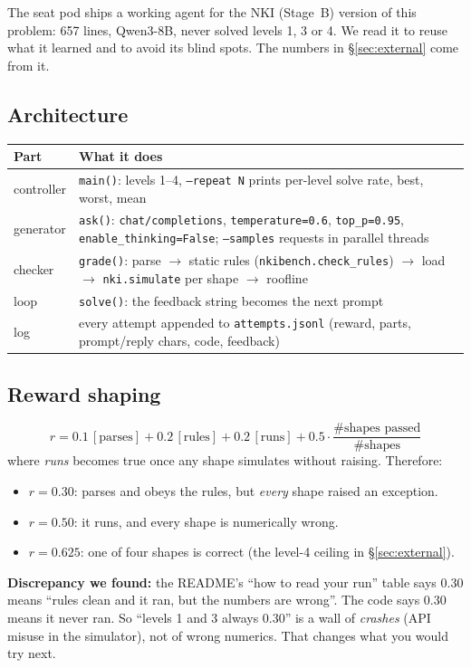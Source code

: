 \documentclass[11pt]{article}
\newcommand{\code}[1]{\texttt{#1}}
\begin{document}
The seat pod ships a working agent for the NKI (Stage~B) version of this problem: 657 lines,
Qwen3-8B, never solved levels 1, 3 or 4. We read it to reuse what it learned and to avoid its
blind spots. The numbers in \S\ref{sec:external} come from it.

\subsection{Architecture}

\begin{tabularx}{\linewidth}{@{}lY@{}}
\toprule
Part & What it does \\
\midrule
controller & \code{main()}: levels 1--4, \code{--repeat N} prints per-level solve rate, best,
  worst, mean \\
generator & \code{ask()}: \code{chat/completions}, \code{temperature=0.6}, \code{top\_p=0.95},
  \code{enable\_thinking=False}; \code{--samples} requests in parallel threads \\
checker & \code{grade()}: parse $\to$ static rules (\code{nkibench.check\_rules}) $\to$ load
  $\to$ \code{nki.simulate} per shape $\to$ roofline \\
loop & \code{solve()}: the feedback string becomes the next prompt \\
log & every attempt appended to \code{attempts.jsonl} (reward, parts, prompt/reply chars, code,
  feedback) \\
\bottomrule
\end{tabularx}

\subsection{Reward shaping}

\[
  r = 0.1\,[\text{parses}] + 0.2\,[\text{rules}] + 0.2\,[\text{runs}]
      + 0.5\cdot\frac{\#\text{shapes passed}}{\#\text{shapes}}
\]
where \emph{runs} becomes true once any shape simulates without raising. Therefore:
\begin{itemize}
  \item $r=0.30$: parses and obeys the rules, but \emph{every} shape raised an exception.
  \item $r=0.50$: it runs, and every shape is numerically wrong.
  \item $r=0.625$: one of four shapes is correct (the level-4 ceiling in \S\ref{sec:external}).
\end{itemize}
\textbf{Discrepancy we found:} the README's ``how to read your run'' table says 0.30 means ``rules
clean and it ran, but the numbers are wrong''. The code says 0.30 means it never ran. So
``levels 1 and 3 always 0.30'' is a wall of \emph{crashes} (API misuse in the simulator), not of
wrong numerics. That changes what you would try next.
\end{document}
